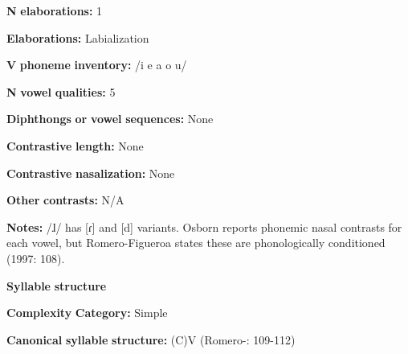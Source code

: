 \documentclass[output=paper]{langsci/langscibook}
\begin{document}
\begin{styleBody}
\textbf{N} \textbf{elaborations:} 1
\end{styleBody}

\begin{styleBody}
\textbf{Elaborations:} Labialization
\end{styleBody}

\begin{styleBody}
\textbf{V} \textbf{phoneme} \textbf{inventory:} /i e a o u/
\end{styleBody}

\begin{styleBody}
\textbf{N} \textbf{vowel} \textbf{qualities:} 5
\end{styleBody}

\begin{styleBody}
\textbf{Diphthongs} \textbf{or} \textbf{vowel} \textbf{sequences:} None
\end{styleBody}

\begin{styleBody}
\textbf{Contrastive} \textbf{length:} None
\end{styleBody}

\begin{styleBody}
\textbf{Contrastive} \textbf{nasalization:} None
\end{styleBody}

\begin{styleBody}
\textbf{Other} \textbf{contrasts:} N/A
\end{styleBody}

\begin{styleBody}
\textbf{Notes:} /ɺ/ has [ɾ] and [d] variants. Osborn reports phonemic nasal contrasts for each vowel, but Romero-Figueroa states these are phonologically conditioned (1997: 108).
\end{styleBody}

\begin{styleBody}
\textbf{Syllable} \textbf{structure}
\end{styleBody}

\begin{styleBody}
\textbf{Complexity} \textbf{Category:} Simple
\end{styleBody}

\begin{styleBody}
\textbf{Canonical} \textbf{syllable} \textbf{structure:} (C)V (Romero-\citealt{Figeroa1997}: 109-112)
\end{styleBody}
\end{document}
